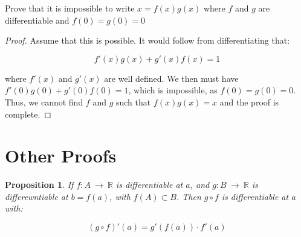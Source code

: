 \documentclass[10pt, oneside]{article}
\newenvironment{problem}[2][Problem]{\begin{trivlist}
\item[\hskip \labelsep {\bfseries #1}\hskip \labelsep {\bfseries #2.}]}{\end{trivlist}}
\newtheorem{prop}{Proposition}
\begin{document}
    \begin{problem}{10.28}
      Prove that it is impossible to write $x = f(x) g(x)$ where $f$ and $g$ are differentiable and $f(0) = g(0) = 0$
    \end{problem}

    \begin{proof}
      Assume that this is possible. It would follow from differentiating that:

      $$f'(x) g(x) + g'(x) f(x) = 1$$

      where $f'(x)$ and $g'(x)$ are well defined. We then must have $f'(0) g(0) + g'(0) f(0) = 1$, which is impossible, as
      $f(0) = g(0) = 0$. Thus, we cannot find $f$ and $g$ such that $f(x) g(x) = x$ and the proof is complete.
    \end{proof}

    \section{Other Proofs}

    \begin{prop}
      If $f : A \ \rightarrow \ \mathbb{R}$ is differentiable at $a$, and $g : B \ \rightarrow \ \mathbb{R}$ is differewntiable at $b = f(a)$, with $f(A) \subset B$. Then
      $g \circ f$ is differentiable at $a$ with:

      $$(g \circ f)'(a) = g'(f(a)) \cdot f'(a)$$
    \end{prop}
\end{document}
